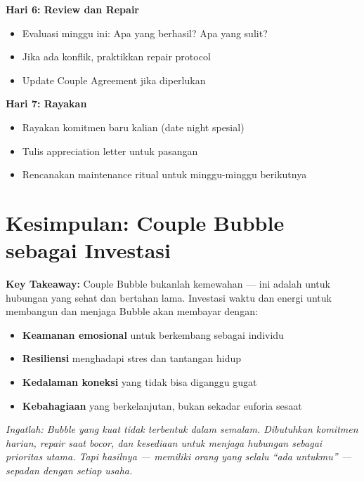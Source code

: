 \begin{exercisebox}
\textbf{Hari 6: Review dan Repair}
\begin{itemize}
    \item Evaluasi minggu ini: Apa yang berhasil? Apa yang sulit?
    \item Jika ada konflik, praktikkan repair protocol
    \item Update Couple Agreement jika diperlukan
\end{itemize}

\textbf{Hari 7: Rayakan}
\begin{itemize}
    \item Rayakan komitmen baru kalian (date night spesial)
    \item Tulis appreciation letter untuk pasangan
    \item Rencanakan maintenance ritual untuk minggu-minggu berikutnya
\end{itemize}
\end{exercisebox}

\section{Kesimpulan: Couple Bubble sebagai Investasi}

\begin{insightbox}
\textbf{Key Takeaway:} Couple Bubble bukanlah kemewahan --- ini adalah  untuk hubungan yang sehat dan bertahan lama. Investasi waktu dan energi untuk membangun dan menjaga Bubble akan membayar dengan:

\begin{itemize}
    \item \textbf{Keamanan emosional} untuk berkembang sebagai individu
    \item \textbf{Resiliensi} menghadapi stres dan tantangan hidup
    \item \textbf{Kedalaman koneksi} yang tidak bisa diganggu gugat
    \item \textbf{Kebahagiaan} yang berkelanjutan, bukan sekadar euforia sesaat
\end{itemize}

\textit{Ingatlah: Bubble yang kuat tidak terbentuk dalam semalam. Dibutuhkan komitmen harian, repair saat bocor, dan kesediaan untuk menjaga hubungan sebagai prioritas utama. Tapi hasilnya --- memiliki orang yang selalu ``ada untukmu'' --- sepadan dengan setiap usaha.}
\end{insightbox}


